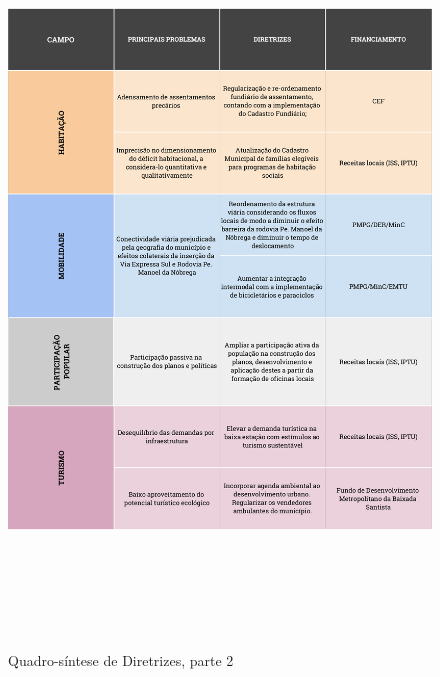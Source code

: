 	\begin{figure}[h]
		\centering
		\caption{Quadro-síntese de Diretrizes, parte 2}
		\includegraphics[width=22cm,height=20cm,keepaspectratio]{img/dir02.png}
	\end{figure}
    
